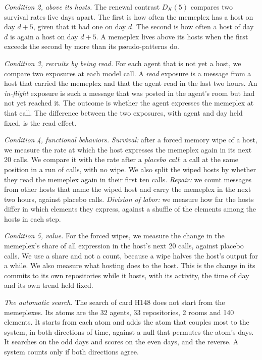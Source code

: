 \emph{Condition 2, above its hosts.} The renewal contrast $D_K(5)$ compares two survival rates five days apart. The first is how often the memeplex has a host on day $d+5$, given that it had one on day $d$. The second is how often a host of day $d$ is again a host on day $d+5$. A memeplex lives above its hosts when the first exceeds the second by more than its pseudo-patterns do.

\emph{Condition 3, recruits by being read.} For each agent that is not yet a host, we compare two exposures at each model call. A \emph{read} exposure is a message from a host that carried the memeplex and that the agent read in the last two hours. An \emph{in-flight} exposure is such a message that was posted in the agent's room but had not yet reached it. The outcome is whether the agent expresses the memeplex at that call. The difference between the two exposures, with agent and day held fixed, is the read effect.

\emph{Condition 4, functional behaviors.} \emph{Survival:} after a forced memory wipe of a host, we measure the rate at which the host expresses the memeplex again in its next 20 calls. We compare it with the rate after a \emph{placebo call}: a call at the same position in a run of calls, with no wipe. We also split the wiped hosts by whether they read the memeplex again in their first ten calls. \emph{Repair:} we count messages from other hosts that name the wiped host and carry the memeplex in the next two hours, against placebo calls. \emph{Division of labor:} we measure how far the hosts differ in which elements they express, against a shuffle of the elements among the hosts in each step.

\emph{Condition 5, value.} For the forced wipes, we measure the change in the memeplex's share of all expression in the host's next 20 calls, against placebo calls. We use a share and not a count, because a wipe halves the host's output for a while. We also measure what hosting does to the host. This is the change in its commits to its own repositories while it hosts, with its activity, the time of day and its own trend held fixed.

\emph{The automatic search.} The search of card H148 does not start from the memeplexes. Its atoms are the 32 agents, 33 repositories, 2 rooms and 140 elements. It starts from each atom and adds the atom that couples most to the system, in both directions of time, against a null that permutes the atom's days. It searches on the odd days and scores on the even days, and the reverse. A system counts only if both directions agree.

